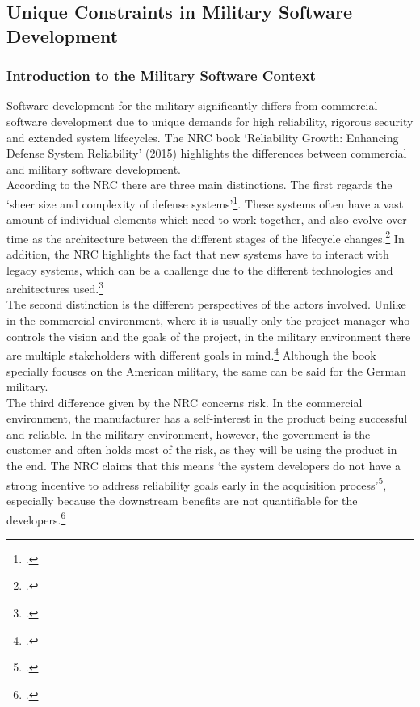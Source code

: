 \subsection{Unique Constraints in Military Software Development}
\subsubsection{Introduction to the Military Software Context}
Software development for the military significantly differs from commercial software development due to unique demands for high reliability, rigorous security and extended system lifecycles.
The \ac{NRC} book `Reliability Growth: Enhancing Defense System Reliability' (2015) highlights the differences between commercial and military software development.\\
According to the NRC there are three main distinctions. The first regards the `sheer size and complexity of defense systems'\footcite[31]{nrc2015defense}.
These systems often have a vast amount of individual elements which need to work together, and also evolve over time as the architecture  between the different stages of 
the lifecycle changes.\footcite[32]{nrc2015defense} In addition, the \ac{NRC} highlights the fact that new systems have to interact with legacy systems, which can be a challenge
due to the different technologies and architectures used.\footcite[32]{nrc2015defense}\\
The second distinction is the different perspectives of the actors involved. Unlike in the commercial environment, where it is usually only the project manager 
who controls the vision and the goals of the project, in the military environment there are multiple stakeholders with different goals in mind.\footcite[32]{nrc2015defense}
Although the book specially focuses on the American military, the same can be said for the German military.\\
The third difference given by the NRC concerns risk. In the commercial environment, the manufacturer has a self-interest in the product being successful and reliable.
In the military environment, however, the government is the customer and often holds most of the risk, as they will be using the product in the end.
The NRC claims that this means `the system developers do not have a strong incentive to address reliability goals early in the acquisition process'\footcite[33]{nrc2015defense},
especially because the downstream benefits are not quantifiable for the developers.\footcite[33]{nrc2015defense}\\
